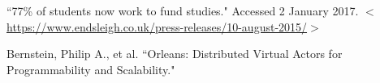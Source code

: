 \documentclass[12pt, a4paper]{article}
\begin{document}
\newpage
\begin{thebibliography}{9}
``77\% of students now work to fund studies." Accessed 2 January 2017. $<$\url{https://www.endsleigh.co.uk/press-releases/10-august-2015/}$>$

Bernstein, Philip A., et al. ``Orleans: Distributed Virtual Actors for Programmability and Scalability."
\end{thebibliography}
\end{document}
